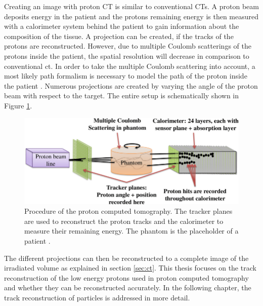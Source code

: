 Creating an image with proton CT is similar to conventional CTs. A proton beam deposits energy in the patient and the
protons remaining energy is then measured with a calorimeter system behind the patient to gain information about the composition of the tissue. A projection can be created,
if the tracks of the protons are reconstructed. However, due to multiple Coulomb scatterings of the protons inside the patient, the spatial resolution will decrease in comparison
to conventional ct. In order to take the multiple Coulomb scattering into account, a most likely path formalism is necessary to model the path of the proton inside the patient \cite{mlp}.
Numerous projections are created by varying the angle of the proton beam with respect to the target. The entire setup is schematically shown in Figure \ref{fig:proton_ct}.

\begin{figure}
  \centering
  \includegraphics[height=0.35\textwidth]{images/proton_ct.png}
  \caption{Procedure of the proton computed tomography. The tracker planes are used to reconstruct the proton tracks and the calorimeter to measure their remaining energy.
  The phantom is the placeholder of a patient \cite{proton_ct}.}
  \label{fig:proton_ct}
\end{figure}

The different projections can then be reconstructed to a complete image of the irradiated volume as explained in section \ref{sec:ct}.
This thesis focuses on the track reconstruction of the low energy protons used in proton computed tomography and whether they can be reconstructed accurately.
In the following chapter, the track reconstruction of particles is addressed in more detail.

